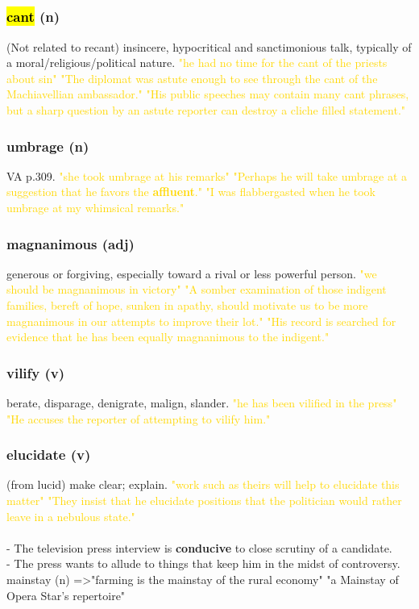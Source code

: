 \documentclass{proc}
\begin{document}
	\newpage
	\subsection{}
	\subsubsection{\textcolor{brickred}{\hl{cant}} (n)}
	(Not related to recant) insincere, hypocritical and sanctimonious talk, typically of a moral/religious/political nature.
	\textcolor{gold}{"he had no time for the cant of the priests about sin" "The diplomat was astute enough to see through the cant of the Machiavellian ambassador." "His public speeches may contain many cant phrases, but a sharp question by an astute reporter can destroy a cliche filled statement."}
	
	\subsubsection{\textcolor{brickred}{umbrage} (n)}
	VA p.309.
	\textcolor{gold}{"she took umbrage at his remarks" "Perhaps he will take umbrage at a suggestion that he favors the \textbf{affluent}." "I was flabbergasted when he took umbrage at my whimsical remarks."}
	
	\subsubsection{\textcolor{brickred}{magnanimous} (adj)}
	generous or forgiving, especially toward a rival or less powerful person.
	\textcolor{gold}{"we should be magnanimous in victory" "A somber examination of those indigent families, bereft of hope, sunken in apathy, should motivate us to be more magnanimous in our attempts to improve their lot." "His record is searched for evidence that he has been equally magnanimous to the indigent."}
	
	\subsubsection{\textcolor{brickred}{vilify} (v)}
	berate,
	disparage,
	denigrate,
	malign,
	slander.
	\textcolor{gold}{"he has been vilified in the press" "He accuses the reporter of attempting to vilify him."}
	
	\subsubsection{\textcolor{brickred}{elucidate} (v)}
	(from lucid) make clear; explain.
	\textcolor{gold}{"work such as theirs will help to elucidate this matter" "They insist that he elucidate positions that the politician would rather leave in a nebulous state."}\\\\
	- The television press interview is \textbf{conducive} to close scrutiny of a candidate.\\
	- The press wants to allude to things that keep him in the midst of controversy.\\
	mainstay (n) =\textgreater "farming is the mainstay of the rural economy" "a Mainstay of Opera Star's repertoire"
	
\end{document}
